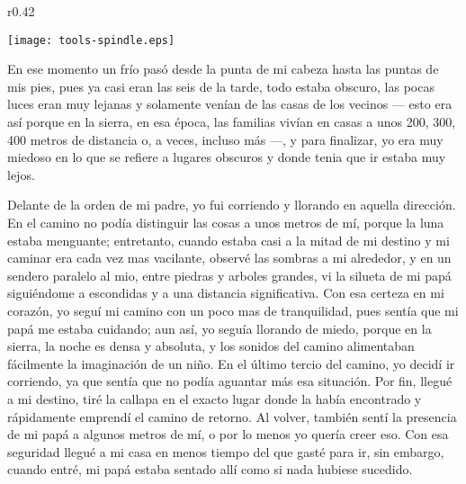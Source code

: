 \ifdefined\EnableIncludeImages
\begin{wrapfigure}{r}{0.42\textwidth}
  \begin{center}
  \vspace{-10pt}
    \texttt{[image: tools-spindle.eps]}
  \end{center}
  \vspace{-20pt}
\end{wrapfigure}
\fi
En ese momento un frío pasó desde la punta de mi cabeza hasta las puntas de mis pies, pues ya casi eran las seis de la tarde, todo estaba obscuro, las pocas luces eran muy lejanas y solamente venían de las casas de los vecinos --- esto era así porque en la sierra, en esa época, las familias vivían en casas a unos 200, 300, 400 metros de distancia o, a veces, incluso más ---, y para finalizar, yo era muy miedoso en lo que se refiere a lugares obscuros y donde tenia que ir estaba muy lejos.

Delante de la orden de mi padre, yo fui corriendo y llorando en aquella dirección. En el camino no podía distinguir las cosas a unos metros de mí, porque la luna estaba menguante; entretanto, cuando estaba casi a la mitad de mi destino y mi caminar era cada vez mas vacilante, observé las sombras a mi alrededor, y en un sendero paralelo al mio, entre piedras y arboles grandes, vi la silueta de mi papá siguiéndome a escondidas y a una distancia significativa.
Con esa certeza en mi corazón, yo seguí mi camino con un poco mas de tranquilidad, pues sentía que mi papá me estaba cuidando; aun así, yo seguía llorando de miedo, porque en la sierra, la noche es densa y absoluta, y los sonidos del camino alimentaban fácilmente la imaginación de un niño.
En el último tercio del camino, yo decidí ir corriendo, ya que sentía que no podía aguantar más esa situación. Por fin, llegué a mi destino, tiré la callapa en el exacto lugar donde la había encontrado y rápidamente emprendí el camino de retorno.
Al volver, también sentí la presencia de mi papá a algunos metros de mí, o por lo menos yo quería creer eso. Con esa seguridad llegué a mi casa en menos tiempo del que gasté para ir, sin embargo, cuando entré, mi papá estaba sentado allí como si nada hubiese sucedido.

